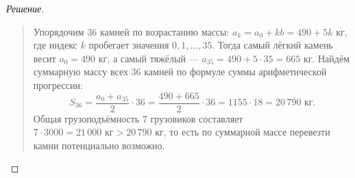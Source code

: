 \begin{proof}[Решение]~\\
    \begin{quote}
        Упорядочим $36$ камней по возрастанию массы: 
        $a_k = a_0 + k b = 490 + 5k\text{ кг}$, где индекс $k$ пробегает 
        значения $0, 1, \dots, 35$. Тогда самый лёгкий камень весит 
        $a_0 = 490\text{ кг}$, а самый тяжёлый --- 
        $a_{35} = 490 + 5 \cdot 35 = 665\text{ кг}$. Найдём суммарную массу 
        всех $36$ камней по формуле суммы арифметической прогрессии:
        \begin{equation} \label{eq:arith_prog_sum}
            S_{36} = \frac{a_0 + a_{35}}{2} \cdot 36 = 
            \frac{490 + 665}{2} \cdot 36 = 1155 \cdot 18 = 20\,790\text{ кг}. 
            \tag{1}
        \end{equation}
        Общая грузоподъёмность $7$ грузовиков составляет 
        $7 \cdot 3000 = 21\,000\text{ кг} > 20\,790\text{ кг}$, то есть по 
        суммарной массе перевезти камни потенциально возможно.


\end{quote}
\end{proof}
